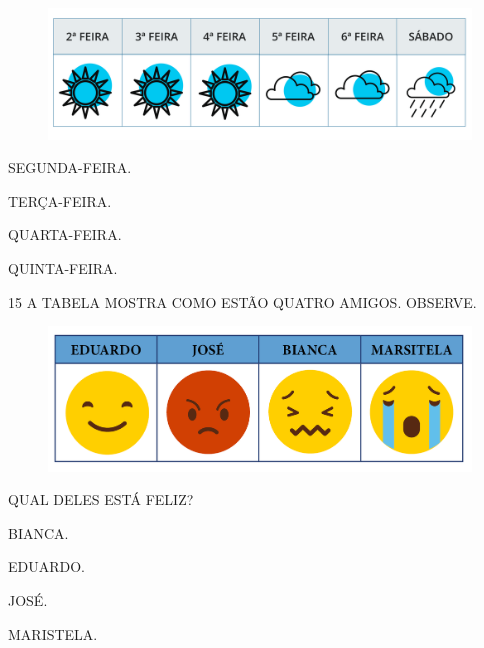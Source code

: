 \begin{figure}[H]
\includegraphics[width=\textwidth]{./media/SAEB_1ANO_MAT_FIGURA127.png}
\end{figure}

\begin{escolha}[itemsep=0pt]
\item SEGUNDA-FEIRA.

\item TERÇA-FEIRA.

\item QUARTA-FEIRA.

\item QUINTA-FEIRA.
\end{escolha}

\num{15} A TABELA MOSTRA COMO ESTÃO QUATRO AMIGOS. OBSERVE.


\begin{figure}[H]
\includegraphics[width=\textwidth]{./media/SAEB_1ANO_MAT_FIGURA128.png}
\end{figure}

QUAL DELES ESTÁ FELIZ?

\begin{escolha}[itemsep=0pt]
\item BIANCA.

\item EDUARDO.

\item JOSÉ.

\item MARISTELA.
\end{escolha}

